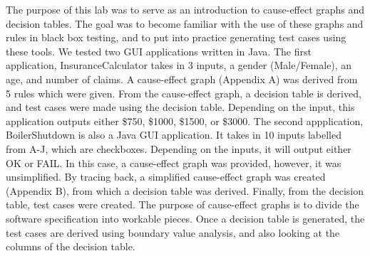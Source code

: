 The purpose of this lab was to serve as an introduction to cause-effect graphs
and decision tables. The goal was to become familiar with the use of these
graphs and rules in black box testing, and to put into practice generating test
cases using these tools. We tested two GUI applications written in Java.
The first application, InsuranceCalculator takes in 3 inputs, a gender
(Male/Female), an age, and number of claims. A cause-effect graph (Appendix A)
was derived from 5 rules which were given. From the cause-effect graph, a
decision table is derived, and test cases were made using the decision table.
Depending on the input, this application outputs either \$750, \$1000, \$1500,
or \$3000. The second appplication, BoilerShutdown is also a Java GUI
application. It takes in 10 inputs labelled from A-J, which are checkboxes.
Depending on the inputs, it will output either OK or FAIL. In this case, a
cause-effect graph was provided, however, it was unsimplified. By tracing back,
a simplified cause-effect graph was created (Appendix B), from which a decision
table was derived. Finally, from the decision table, test cases were created.
The purpose of cause-effect graphs is to divide the software specification into
workable pieces. Once a decision table is generated, the test cases are derived
using boundary value analysis, and also looking at the columns of the decision
table.
